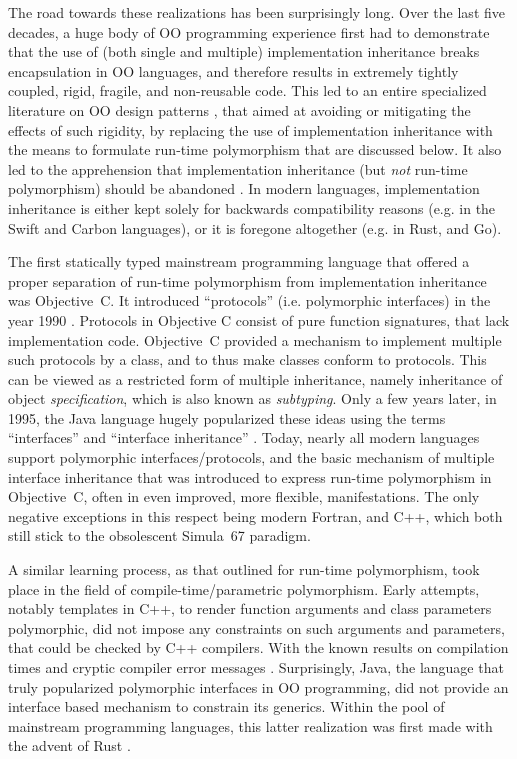 \documentclass[11pt,oneside]{report}
\begin{document}
The road towards these realizations has been surprisingly long. Over
the last five decades, a huge body of OO programming experience first
had to demonstrate that the use of (both single and multiple)
implementation inheritance breaks encapsulation in OO languages, and
therefore results in extremely tightly coupled, rigid, fragile, and
non-reusable code. This led to an entire specialized literature on OO
design patterns \cite{Gamma_et_al_94,Martin_03,Holub_04}, that aimed
at avoiding or mitigating the effects of such rigidity, by replacing
the use of implementation inheritance with the means to formulate
run-time polymorphism that are discussed below. It also led to the
apprehension that implementation inheritance (but \emph{not} run-time
polymorphism) should be abandoned \cite{Weck_Szyperski}. In modern
languages, implementation inheritance is either kept solely for
backwards compatibility reasons (e.g. in the Swift and Carbon
languages), or it is foregone altogether (e.g. in Rust, and Go).

The first statically typed mainstream programming language that
offered a proper separation of run-time polymorphism from
implementation inheritance was Objective~C. It introduced
``protocols'' (i.e. polymorphic interfaces) in the year 1990
\cite{Cox_et_al_20}. Protocols in Objective C consist of pure function
signatures, that lack implementation code. Objective~C provided a
mechanism to implement multiple such protocols by a class, and to thus
make classes conform to protocols. This can be viewed as a restricted
form of multiple inheritance, namely inheritance of object
\emph{specification}, which is also known as \emph{subtyping}. Only a
few years later, in 1995, the Java language hugely popularized these
ideas using the terms ``interfaces'' and ``interface inheritance''
\cite{Cox_et_al_20}. Today, nearly all modern languages support
polymorphic interfaces/protocols, and the basic mechanism of multiple
interface inheritance that was introduced to express run-time
polymorphism in Objective~C, often in even improved, more flexible,
manifestations. The only negative exceptions in this respect being
modern Fortran, and C++, which both still stick to the obsolescent
Simula~67 paradigm.

A similar learning process, as that outlined for run-time
polymorphism, took place in the field of compile-time/parametric
polymorphism. Early attempts, notably templates in C++, to render
function arguments and class parameters polymorphic, did not impose
any constraints on such arguments and parameters, that could be
checked by C++ compilers. With the known results on compilation times
and cryptic compiler error messages
\cite{Haveraaen_et_al_19}. Surprisingly, Java, the language that truly
popularized polymorphic interfaces in OO programming, did not provide
an interface based mechanism to constrain its generics. Within the
pool of mainstream programming languages, this latter realization was
first made with the advent of Rust \cite{Matsakis_2014}.
\end{document}
